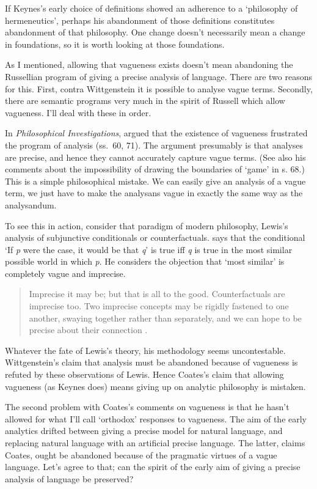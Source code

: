 If Keynes's early choice of definitions showed an adherence to a `philosophy of hermeneutics', perhaps his abandonment of those definitions constitutes abandonment of that philosophy. One change doesn't necessarily mean a change in foundations, so it is worth looking at those foundations.

As I mentioned, allowing that vagueness exists doesn't mean abandoning the Russellian program of giving a precise analysis of language. There are two reasons for this. First, contra Wittgenstein it is possible to analyse vague terms. Secondly, there are semantic programs very much in the spirit of Russell which allow vagueness. I'll deal with these in order.

In \textit{Philosophical Investigations}, \citeauthor{Wittgenstein1953} argued that the existence of vagueness frustrated the program of analysis (ss.~60, 71). The argument presumably is that analyses are precise, and hence they cannot accurately capture vague terms. (See also his comments about the impossibility of drawing the boundaries of `game' in s. 68.) This is a simple philosophical mistake. We can easily give an analysis of a vague term, we just have to make the analysans vague in exactly the same way as the analysandum.

To see this in action, consider that paradigm of modern philosophy, Lewis's analysis of subjunctive conditionals or counterfactuals. \citet{Lewis1973a} says that the conditional `If \textit{p} were the case, it would be that \textit{q}' is true iff \textit{q} is true in the most similar possible world in which \textit{p}. He considers the objection that `most similar' is completely vague and imprecise.

\begin{quote}
Imprecise it may be; but that is all to the good. Counterfactuals are imprecise too. Two imprecise concepts may be rigidly fastened to one another, swaying together rather than separately, and we can hope to be precise about their connection \citet{Lewis1973a}.
\end{quote}

\noindent Whatever the fate of Lewis's theory, his methodology seems uncontestable. Wittgenstein's claim that analysis must be abandoned because of vagueness is refuted by these observations of Lewis. Hence Coates's claim that allowing vagueness (as Keynes does) means giving up on analytic philosophy is mistaken.

The second problem with Coates's comments on vagueness is that he hasn't allowed for what I'll call `orthodox' responses to vagueness. The aim of the early analytics drifted between giving a precise model for natural language, and replacing natural language with an artificial precise language. The latter, claims Coates, ought be abandoned because of the pragmatic virtues of a vague language. Let's agree to that; can the spirit of the early aim of giving a precise analysis of language be preserved?

